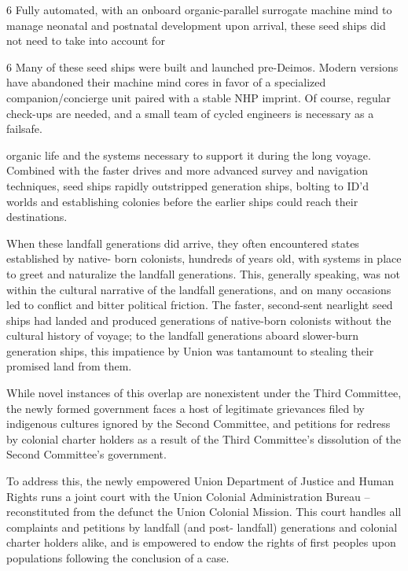                                                                                           6
Fully automated, with an onboard organic-parallel surrogate machine mind  to manage neonatal
and postnatal development upon arrival, these seed ships did not need to take into account for

6 Many of these seed ships were built and launched pre-Deimos. Modern versions have abandoned their
machine mind cores in favor of a specialized companion/concierge unit paired with a stable NHP imprint. Of
course, regular check-ups are needed, and a small team of cycled engineers is necessary as a failsafe.




organic life and the systems necessary to support it during the long voyage. Combined with the
faster drives and more advanced survey and navigation techniques, seed ships rapidly
outstripped generation ships, bolting to ID’d worlds and establishing colonies before the earlier
ships could reach their destinations.


When these landfall generations did arrive, they often encountered states established by native-
born colonists, hundreds of years old, with systems in place to greet and naturalize the landfall
generations. This, generally speaking, was not within the cultural narrative of the landfall
generations, and on many occasions led to conflict and bitter political friction. The faster,
second-sent nearlight seed ships had landed and produced generations of native-born colonists
without the cultural history of voyage; to the landfall generations aboard slower-burn generation
ships, this impatience by Union was tantamount to stealing their promised land from them.


While novel instances of this overlap are nonexistent under the Third Committee, the newly
formed government faces a host of legitimate grievances filed by indigenous cultures ignored by
the Second Committee, and petitions for redress by colonial charter holders as a result of the
Third Committee’s dissolution of the Second Committee’s government.


To address this, the newly empowered Union Department of Justice and Human Rights runs a
joint court with the Union Colonial Administration Bureau -- reconstituted from the defunct the
Union Colonial Mission. This court handles all complaints and petitions by landfall (and post-
landfall) generations and colonial charter holders alike, and is empowered to endow the rights of
first peoples upon populations following the conclusion of a case.


